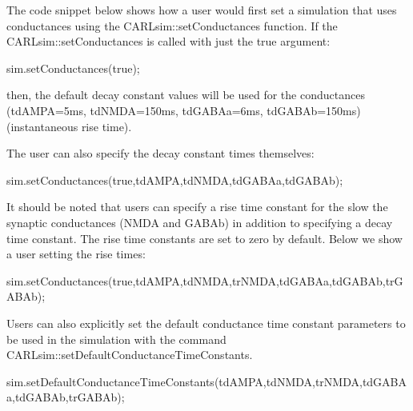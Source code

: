 The code snippet below shows how a user would first set a simulation that uses conductances using the C\+A\+R\+Lsim\+::set\+Conductances function. If the C\+A\+R\+Lsim\+::set\+Conductances is called with just the true argument\+:


\begin{DoxyCode}
sim.setConductances(\textcolor{keyword}{true});
\end{DoxyCode}


then, the default decay constant values will be used for the conductances (td\+A\+M\+PA=5ms, td\+N\+M\+DA=150ms, td\+G\+A\+B\+Aa=6ms, td\+G\+A\+B\+Ab=150ms) (instantaneous rise time).

The user can also specify the decay constant times themselves\+:


\begin{DoxyCode}
sim.setConductances(\textcolor{keyword}{true},tdAMPA,tdNMDA,tdGABAa,tdGABAb);
\end{DoxyCode}


It should be noted that users can specify a rise time constant for the slow the synaptic conductances (N\+M\+DA and G\+A\+B\+Ab) in addition to specifying a decay time constant. The rise time constants are set to zero by default. Below we show a user setting the rise times\+:


\begin{DoxyCode}
sim.setConductances(\textcolor{keyword}{true},tdAMPA,tdNMDA,trNMDA,tdGABAa,tdGABAb,trGABAb);
\end{DoxyCode}


Users can also explicitly set the default conductance time constant parameters to be used in the simulation with the command C\+A\+R\+Lsim\+::set\+Default\+Conductance\+Time\+Constants.


\begin{DoxyCode}
sim.setDefaultConductanceTimeConstants(tdAMPA,tdNMDA,trNMDA,tdGABAa,tdGABAb,trGABAb);
\end{DoxyCode}


